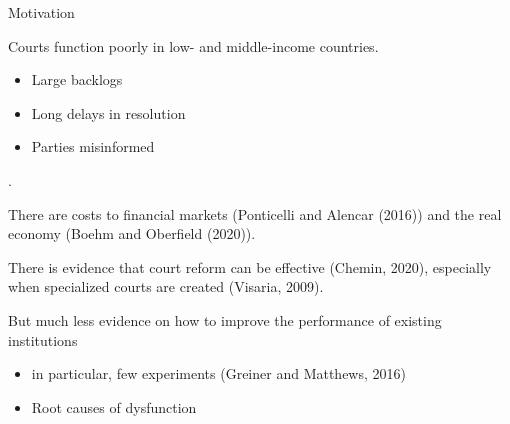 \documentclass[9pt]{beamer}
\begin{document}
\begin{frame}{Motivation}{}

  Courts function poorly in low- and middle-income countries.
  \begin{itemize}
      \item Large backlogs
      \item Long delays in resolution
      \item Parties misinformed
  \end{itemize}. 
  
  \vspace{2mm}
  \noindent There are costs to financial markets (Ponticelli and Alencar (2016)) and the real economy (Boehm and Oberfield (2020)). 
  
  \pause
  \vspace{4mm}
  There is  evidence that court reform can be effective (Chemin, 2020), especially when specialized courts are created (Visaria, 2009). 
  
  \vspace{4mm}
  But much less evidence on how to improve the performance of existing institutions
\begin{itemize}
    \item in particular, few experiments (Greiner and Matthews, 2016)
    \item Root causes of dysfunction
\end{itemize}
  \end{frame}
  
\end{document}
